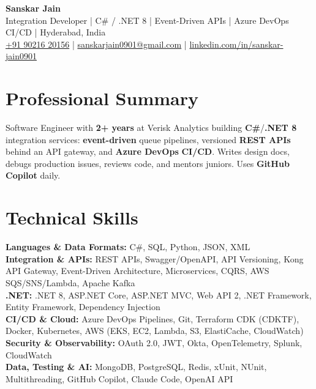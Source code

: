 \documentclass[a4paper,10pt]{article}
\begin{document}
\begin{center}
    {\LARGE \textbf{Sanskar Jain}} \\
    \vspace{2pt}
    Integration Developer \;|\; C\# / .NET 8 \;|\; Event-Driven APIs \;|\; Azure DevOps CI/CD \;|\; Hyderabad, India \\
    \vspace{2pt}
    \href{tel:+919021620156}{+91 90216 20156} \;|\;
    \href{mailto:sanskarjain0901@gmail.com}{sanskarjain0901@gmail.com} \;|\;
    \href{https://www.linkedin.com/in/sanskar-jain0901/}{linkedin.com/in/sanskar-jain0901}
\end{center}

\section*{Professional Summary}
Software Engineer with \textbf{2+ years} at Verisk Analytics building \textbf{C\#}/\textbf{.NET 8} integration services: \textbf{event-driven} queue pipelines, versioned \textbf{REST APIs} behind an API gateway, and \textbf{Azure DevOps} \textbf{CI/CD}. Writes design docs, debugs production issues, reviews code, and mentors juniors. Uses \textbf{GitHub Copilot} daily.

\section*{Technical Skills}
\begin{sloppypar}
\noindent
\textbf{Languages \& Data Formats:} C\#, SQL, Python, JSON, XML \\
\textbf{Integration \& APIs:} REST APIs, Swagger/OpenAPI, API Versioning, Kong API Gateway, Event-Driven Architecture, Microservices, CQRS, AWS SQS/SNS/Lambda, Apache Kafka \\
\textbf{.NET:} .NET 8, ASP.NET Core, ASP.NET MVC, Web API 2, .NET Framework, Entity Framework, Dependency Injection \\
\textbf{CI/CD \& Cloud:} Azure DevOps Pipelines, Git, Terraform CDK (CDKTF), Docker, Kubernetes, AWS (EKS, EC2, Lambda, S3, ElastiCache, CloudWatch) \\
\textbf{Security \& Observability:} OAuth 2.0, JWT, Okta, OpenTelemetry, Splunk, CloudWatch \\
\textbf{Data, Testing \& AI:} MongoDB, PostgreSQL, Redis, xUnit, NUnit, Multithreading, GitHub Copilot, Claude Code, OpenAI API
\end{sloppypar}
\end{document}

